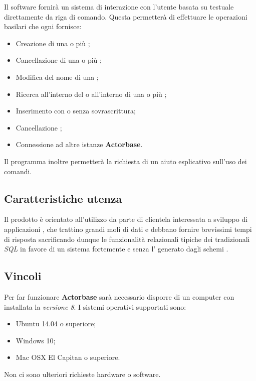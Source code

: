 \documentclass{scalatekids-article}
\begin{document}
Il software fornirà un sistema di interazione con l'utente basata su 
testuale direttamente da riga di comando. Questa permetterà di effettuare le operazioni
basilari che ogni  fornisce:
\begin{itemize}
\item Creazione di una o più ;
\item Cancellazione di una o più ;
\item Modifica del nome di una ;
\item Ricerca all'interno del  o all'interno di una o più ;
\item Inserimento  con o senza sovrascrittura;
\item Cancellazione ;
\item Connessione ad altre istanze \textbf{Actorbase}.
\end{itemize}
Il programma inoltre permetterà la richiesta di un aiuto esplicativo sull'uso
dei comandi.

\subsection{Caratteristiche utenza}

Il prodotto è orientato all'utilizzo da parte di clientela interessata a
sviluppo di applicazioni , che trattino grandi moli di dati e
debbano fornire brevissimi tempi di risposta sacrificando dunque le funzionalità
relazionali tipiche dei tradizionali  \textit{SQL} in favore di
un sistema fortemente  e senza l' generato
dagli schemi .

\subsection{Vincoli}

Per far funzionare \textbf{Actorbase} sarà necessario disporre di un computer con
installata la \textit{ versione 8}. I sistemi operativi supportati sono:
\begin{itemize}
\item Ubuntu 14.04 o superiore;
\item Windows 10;
\item Mac OSX El Capitan o superiore.
\end{itemize}
Non ci sono ulteriori richieste hardware o software.
\end{document}
